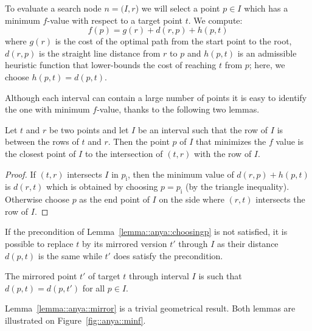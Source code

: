 To evaluate a search node $n = (I, r$) we will select a point $p \in I$ 
which has a minimum $f$-value with respect to a target point $t$.
We compute: 
\begin{equation}
\label{eq::f}
f(p) = g(r) + d(r, p) + h(p, t)
\end{equation}
where $g(r)$ is the cost of the optimal path from the start point to 
the root, $d(r, p)$ is the straight line distance from $r$ to $p$
and $h(p, t)$ is an admissible heuristic function that lower-bounds the cost of reaching $t$ from $p$; here, we choose $h(p,t) = d(p,t)$.

Although each interval can contain a large number of points it is easy to
identify the one with minimum $f$-value, 
thanks to the following two lemmas.  

\begin{lemma}\label{lemma::anya::choosingp}
  Let $t$ and $r$ be two points 
  and let $I$ be an interval 
  such that the row of $I$ is between the rows of $t$ and $r$.  
  Then the point $p$ of $I$ 
  that minimizes the $f$ value 
  is the closest point of $I$ to the intersection of $(t,r)$ 
  with the row of $I$.  
\end{lemma}

\begin{proof}
  If $(t,r)$ intersects $I$ in $p_\mathrm{i}$, 
  then the minimum value of $d(r,p) + h(p,t)$ 
  is $d(r,t)$ which is obtained 
  by choosing $p = p_{\mathrm{i}}$ (by the triangle inequality).  
  Otherwise choose $p$ as the end point of $I$ 
  on the side where $(r,t)$ intersects the row of $I$.  
\end{proof}

If the precondition of Lemma~\ref{lemma::anya::choosingp} is not satisfied, 
it is possible to replace $t$ by its mirrored version $t'$ through $I$ 
as their distance $d(p,t)$ is the same 
while $t'$ does satisfy the precondition.  

\begin{lemma}
\label{lemma::anya::mirror}
  The mirrored point $t'$ of target $t$ 
  through interval $I$ is such that   
  $d(p,t) = d(p,t')$ for all $p \in I$.  
\end{lemma}

Lemma~\ref{lemma::anya::mirror} is a trivial geometrical result.  
Both lemmas are illustrated on Figure~\ref{fig::anya::minf}.  


